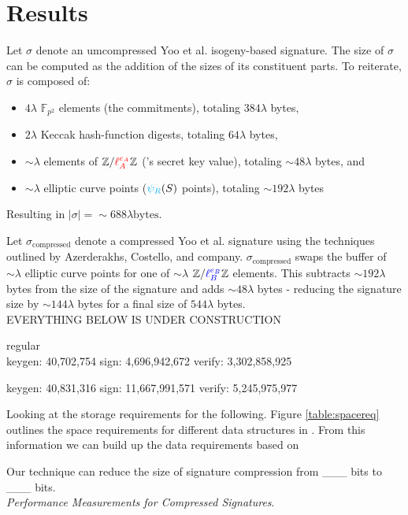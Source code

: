 \section{Results}

Let $\sigma$ denote an umcompressed Yoo et al. isogeny-based signature. The size of $\sigma$ can be computed as the addition of the sizes of its constituent parts. To reiterate, $\sigma$ is composed of:
\begin{itemize}
\item $4\lambda$ $\mathbb{F}_{p^2}$ elements (the commitments), totaling $384\lambda$ bytes,
\item $2\lambda$ Keccak hash-function digests, totaling $64\lambda$ bytes,
\item $\sim\lambda$ elements of $\mathbb{Z}/\textcolor{red}{\ell_{A}^{e_A}}\mathbb{Z}$ (\randall's secret key value), totaling $\sim48\lambda$ bytes, and
\item $\sim\lambda$ elliptic curve points ($\textcolor{cyan}{\psi_R}(S)$ points), totaling $\sim192\lambda$ bytes
\end{itemize}
Resulting in $\vert \sigma \vert = \sim688\lambda \text{bytes}$.  

Let $\sigma_{\text{compressed}}$ denote a compressed Yoo et al. signature using the techniques outlined by Azerderakhs, Costello, and company. $\sigma_{\text{compressed}}$ swaps the buffer of $\sim\lambda$ elliptic curve points for one of $\sim\lambda$ $\mathbb{Z}/\textcolor{blue}{\ell_{B}^{e_B}}\mathbb{Z}$ elements. This subtracts $\sim192\lambda$ bytes from the size of the signature and adds $\sim48\lambda$ bytes - reducing the signature size by $\sim144\lambda$ bytes for a final size of $544\lambda$ bytes.\\

EVERYTHING BELOW IS UNDER CONSTRUCTION

regular\\
keygen:    40,702,754
sign:   4,696,942,672
verify: 3,302,858,925

keygen:    40,831,316
sign:  11,667,991,571
verify: 5,245,975,977

Looking at the storage requirements for the following. Figure \ref{table:spacereq} outlines the space requirements for different data structures in \sidh. From this information we can build up the data requirements based on  

Our technique can reduce the size of \sidh signature compression from \_\_\_ bits to \_\_\_ bits.\\

\noindent
\textit{Performance Measurements for Compressed Signatures}.

